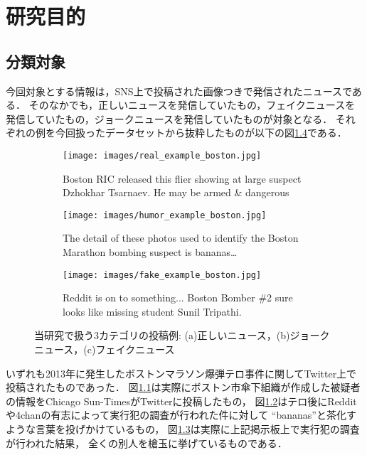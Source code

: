 \chapter{研究目的}
%
\section{分類対象}
今回対象とする情報は，SNS上で投稿された画像つきで発信されたニュースである．
そのなかでも，正しいニュースを発信していたもの，フェイクニュースを発信していたもの，ジョークニュースを発信していたものが対象となる．
それぞれの例を今回扱ったデータセットから抜粋したものが以下の図\ref{fig:examples}である．

\begin{figure}[ht]
    \centering
    \begin{subfigure}[b]{0.4\textwidth}
        \texttt{[image: images/real\_example\_boston.jpg]}
        \caption{Boston RIC released this flier showing at large suspect Dzhokhar Tsarnaev. He may be armed \& dangerous}
        \label{fig:real}
    \end{subfigure}
    \hfill %
    \begin{subfigure}[b]{0.57\textwidth}
        \texttt{[image: images/humor\_example\_boston.jpg]}
        \caption{The detail of these photos used to identify the Boston Marathon bombing suspect is bananas…}
        \label{fig:humor}
    \end{subfigure}
    \bigskip 
    \centering
    \begin{subfigure}[b]{\textwidth}
        \texttt{[image: images/fake\_example\_boston.jpg]}
        \caption{Reddit is on to something... Boston Bomber \#2 sure looks like missing student Sunil Tripathi. }
        \label{fig:fake}
    \end{subfigure}
    \caption{当研究で扱う3カテゴリの投稿例: (a)正しいニュース，(b)ジョークニュース，(c)フェイクニュース}
    \label{fig:examples}
\end{figure}

いずれも2013年に発生したボストンマラソン爆弾テロ事件に関してTwitter上で投稿されたものであった．
図\ref{fig:real}は実際にボストン市傘下組織が作成した被疑者の情報をChicago Sun-TimesがTwitterに投稿したもの，
図\ref{fig:humor}はテロ後にRedditや4chanの有志によって実行犯の調査が行われた件に対して
``bananas''と茶化すような言葉を投げかけているもの，
図\ref{fig:fake}は実際に上記掲示板上で実行犯の調査が行われた結果，
全くの別人を槍玉に挙げているものである．

